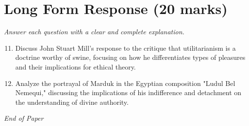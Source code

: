 \documentclass[12pt]{article}
\begin{document}
\section*{Long Form Response (20 marks)}
\textit{Answer each question with a clear and complete explanation.}
\begin{enumerate}[label=\arabic*.]
\setcounter{enumi}{10}
\item Discuss John Stuart Mill's response to the critique that utilitarianism is a doctrine worthy of swine, focusing on how he differentiates types of pleasures and their implications for ethical theory.
\item Analyze the portrayal of Marduk in the Egyptian composition "Ludul Bel Nemequi," discussing the implications of his indifference and detachment on the understanding of divine authority.
\end{enumerate}

\vfill
\noindent\textit{End of Paper}
\end{document}
